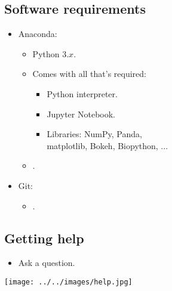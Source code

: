 \documentclass[aspectratio=1610,slidestop]{beamer}
\begin{document}
\subsection{Software requirements}
\begin{pframe}
 \begin{itemize}
  \item Anaconda:
  \begin{itemize}
   \item Python $3.x$.
   \item Comes with all that's required:
   \begin{itemize}
    \item Python interpreter.
    \item Jupyter Notebook.
    \item Libraries: NumPy, Panda,\\
    matplotlib, Bokeh, Biopython, ...
   \end{itemize}
   \item {}.
  \end{itemize}
  \bigskip
  \item Git:
  \begin{itemize}
   \item {}.
  \end{itemize}
 \end{itemize}
\end{pframe}

\subsection{Getting help}
\begin{pframe}
 \begin{itemize}
  \item Ask a question.
 \end{itemize}
 \begin{center}
  \texttt{[image: ../../images/help.jpg]}
 \end{center}
\end{pframe}



\end{document}
